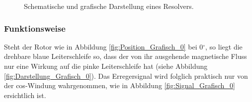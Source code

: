 \begin{figure}[h!]
\centering
{}
\hfill
{}
\hfill
\caption{Schematische und grafische Darstellung eines Resolvers.}
\label{fig:Schematisch_Grafisch_Resolver}
\end{figure}

\subsubsection{Funktionsweise}\label{par:Funktionsweise_Resolver}

Steht der Rotor wie in Abbildung \ref{fig:Position_Grafisch_0} bei 0$^\circ$, so liegt die drehbare blaue Leiterschleife so, dass der von ihr ausgehende magnetische Fluss nur eine Wirkung auf die pinke Leiterschleife hat (siehe Abbildung \ref{fig:Darstellung_Grafisch_0}). Das Erregersignal wird folglich praktisch nur von der cos-Windung wahrgenommen, wie in Abbildung \ref{fig:Signal_Grafisch_0} ersichtlich ist.

